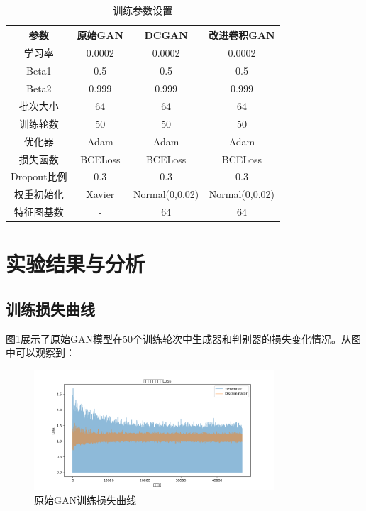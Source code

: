 \documentclass[UTF8]{ctexart}
\begin{document}
\begin{table}[H]
\centering
\caption{训练参数设置}
\begin{tabular}{|c|c|c|c|}
\hline
\textbf{参数} & \textbf{原始GAN} & \textbf{DCGAN} & \textbf{改进卷积GAN} \\
\hline
学习率 & 0.0002 & 0.0002 & 0.0002 \\
\hline
Beta1 & 0.5 & 0.5 & 0.5 \\
\hline
Beta2 & 0.999 & 0.999 & 0.999 \\
\hline
批次大小 & 64 & 64 & 64 \\
\hline
训练轮数 & 50 & 50 & 50 \\
\hline
优化器 & Adam & Adam & Adam \\
\hline
损失函数 & BCELoss & BCELoss & BCELoss \\
\hline
Dropout比例 & 0.3 & 0.3 & 0.3 \\
\hline
权重初始化 & Xavier & Normal(0,0.02) & Normal(0,0.02) \\
\hline
特征图基数 & - & 64 & 64 \\
\hline
\end{tabular}
\end{table}

\section{实验结果与分析}

\subsection{训练损失曲线}

图\ref{fig:loss_curves}展示了原始GAN模型在50个训练轮次中生成器和判别器的损失变化情况。从图中可以观察到：

\begin{figure}[H]
\centering
\includegraphics[width=0.8\textwidth]{loss_curves.png}
\caption{原始GAN训练损失曲线}
\label{fig:loss_curves}
\end{figure}
\end{document}
